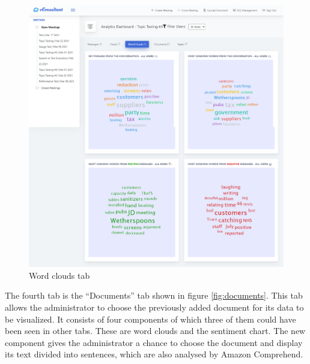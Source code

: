 \documentclass{article}
\begin{document}
\begin{figure}[H]
  \centering
  \includegraphics[scale=0.28]{implementation/wordCloudsTab.jpg}
  \caption{Word clouds tab}
  \label{fig:wordCloudsTab}
\end{figure}

{\large 
The fourth tab is the ``Documents'' tab shown in figure \ref{fig:documents}. This tab allows the administrator to choose the previously added document for its data to be visualized. It consists of four components of which three of them could have been seen in other tabs. These are word clouds and the sentiment chart. The new component gives the administrator a chance to choose the document and display its text divided into sentences, which are also analysed by Amazon Comprehend.\par 
}
\end{document}

